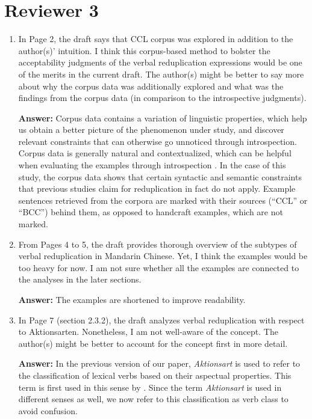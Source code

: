 \documentclass[fleqn,twoside]{article}
\begin{document}
\section{Reviewer 3}

\begin{enumerate}
\item
In Page 2, the draft says that CCL corpus was explored in addition to the author(s)' intuition. I think this corpus-based method to bolster the acceptability judgments of the verbal reduplication expressions would be one of the merits in the current draft. The author(s) might be better to say more about why the corpus data was additionally explored and what was the findings from the corpus data (in comparison to the introspective judgments).

\textbf{Answer:}
 Corpus data contains a variation of linguistic properties, which help us obtain a better picture of the phenomenon under study,
 and discover relevant constraints that can otherwise go unnoticed through introspection.
 Corpus data is generally natural and contextualized, which can be helpful when evaluating the examples through introspection \citep[921]{MM2009a}.
 In the case of this study, the corpus data shows that certain syntactic and semantic constraints that previous studies claim for reduplication in fact do not apply.
Example sentences retrieved from the corpora are marked with their sources (``CCL'' or ``BCC'') behind them,
as opposed to handcraft examples, which are not marked.

\item
From Pages 4 to 5, the draft provides thorough overview of the subtypes of verbal reduplication in Mandarin Chinese. Yet, I think the examples would be too heavy for now. I am not sure whether all the examples are connected to the analyses in the later sections.

\textbf{Answer:} The examples are shortened to improve readability.

\item 
In Page 7 (section 2.3.2), the draft analyzes verbal reduplication with respect to Aktionsarten. Nonetheless, I am not well-aware of the concept. The author(s) might be better to account for the concept first in more detail.

\textbf{Answer:} 
In the previous version of our paper, \textit{Aktionsart} is used to refer to the classification of lexical verbs based on their aspectual properties.
This term is first used in this sense by \citet{Agrell1908}. %
Since the term \textit{Aktionsart} is used in different senses as well,
we now refer to this classification as verb class to avoid confusion.


\end{enumerate}
\end{document}
